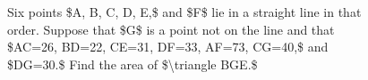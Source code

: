\begin{figure}[H]
\centering
\setlength{\columnsep}{12pt}
\setlength{\colw}{\dimexpr(\linewidth-2\columnsep)/3\relax}
\begin{promptrow}
\caret{}\par\vspace{4pt}
Six points \$A, B, C, D, E,\$ and \$F\$ lie in a straight line in that order. Suppose that \$G\$ is a point not on the line and that \$AC=26, BD=22, CE=31, DF=33, AF=73, CG=40,\$ and \$DG=30.\$ Find the area of \$\textbackslash{}triangle BGE.\$
\par\vspace{6pt}
{}\par\vspace{3pt}
{\monofont\footnotesize {}}
\end{promptrow}

\vspace{12pt}


\end{figure}
